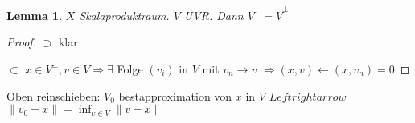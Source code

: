\documentclass[ngerman]{report}
\theoremstyle{plain}%
\newtheorem{lemma}[thm]{Lemma}
\theoremstyle{definition}%
\theoremstyle{myStyle}
\newcommand{\norm}[1]{\|#1\|}
\newcommand{\df}[1][]{%
	\overset{#1}{\Rightarrow}
}
\begin{document}
	\begin{lemma}
		$X$ Skalaproduktraum. $V$ UVR. Dann $V^\perp = \overline{V}^\perp$
	\end{lemma}
	\begin{proof}
		$\supset$ klar \par
		$\subset$ $x\in V^\perp, v\in V \df \exists$ Folge $(v_i)$ in $V$ mit $v_n \to v$
		$\df (x,v) \leftarrow (x,v_n) = 0$
	\end{proof}
 Oben reinschieben: $V_0$ bestapproximation von $x$ in $V$ $Leftrightarrow$ $\norm{v_0 - x} = \inf_{v\in V}\norm{v-x}$

\end{document}
